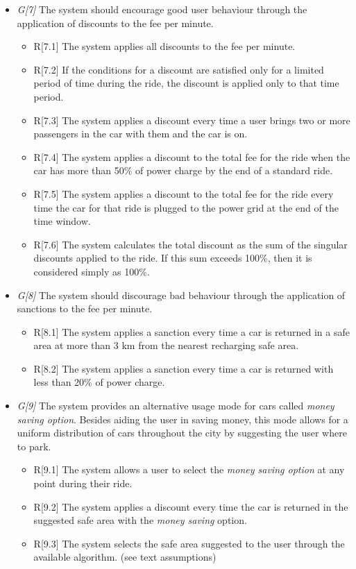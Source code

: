 \begin{itemize}
				\item \textit{G[7]} The system should encourage good user behaviour through the application of discounts to the fee per minute. 
					\begin{itemize}
						\item R[7.1] The system applies all discounts to the fee per minute.
						\item R[7.2] If the conditions for a discount are satisfied only for a limited period of time during the ride, the discount is applied only to that time period. %
						\item R[7.3] The system applies a discount every time a user brings two or more passengers in the car with them and the car is on.
						\item R[7.4] The system applies a discount to the total fee for the ride when the car has more than 50\% of power charge by the end of a standard ride.
						\item R[7.5] The system applies a discount to the total fee for the ride every time the car for that ride is plugged to the power grid at the end of the time window. 
						\item R[7.6] The system calculates the total discount as the sum of the singular discounts applied to the ride. If this sum exceeds 100\%, then it is considered simply as 100\%.
					\end{itemize}
					
				\item \textit{G[8]} The system should discourage bad behaviour through the application of sanctions to the fee per minute.
					\begin{itemize}
						\item R[8.1] The system applies a sanction every time a car is returned in a safe area at more than 3 km from the nearest recharging safe area.
						\item R[8.2] The system applies a sanction every time a car is returned with less than 20\% of power charge.
					\end{itemize}
					
				\item \textit{G[9]} The system provides an alternative usage mode for cars called \textit{money saving option}. Besides aiding the user in saving money, this mode allows for a uniform distribution of cars throughout the city by suggesting the user where to park.
					\begin{itemize}
						\item R[9.1] The system allows a user to select the \textit{money saving option} at any point during their ride. 
						\item R[9.2] The system applies a discount every time the car is returned in the suggested safe area with the \textit{money saving} option.
						\item R[9.3] The system selects the safe area suggested to the user through the available algorithm. (see text assumptions)
					\end{itemize}
					

\end{itemize}
